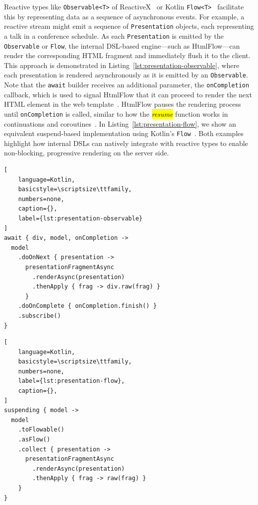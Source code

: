 \documentclass[software,article,accept,pdftex,moreauthors]{Definitions/mdpi}
\begin{document}
Reactive types like \texttt{Observable<T>} of ReactiveX~\cite{rxjava} or Kotlin \texttt{Flow<T>}~\cite{kotlinlang}
facilitate this by representing data as a sequence of asynchronous events.
For example, a reactive stream might emit a sequence of \texttt{Presentation}
objects, each representing a talk in a conference schedule.
As each \texttt{Presentation} is emitted by the \texttt{Observable}
or \texttt{Flow}, the internal DSL-based engine---such as HtmlFlow---can render the
corresponding HTML fragment and immediately flush it to the client. This
approach is demonstrated in Listing~\ref{lst:presentation-observable}, where each
presentation is rendered asynchronously as it is emitted by an
\texttt{Observable}.
Note that the \texttt{await} builder receives an additional parameter, the
\texttt{onCompletion} callback, which is used to signal HtmlFlow that it can
proceed to render the next HTML element in the web
template~\cite{carvalho2023async}.
HtmlFlow pauses the rendering process until \texttt{onCompletion} is called,
similar to how the \emph{\hl{resume}} function works in continuations and
coroutines~\cite{coroutines_continuations}.
In Listing~\ref{lst:presentation-flow}, we show an
equivalent suspend-based implementation using Kotlin's \texttt{Flow}~\cite{wise2024pssr}.
Both examples highlight how internal DSLs can natively integrate with reactive types
to enable non-blocking, progressive rendering on the server side.

\begin{listing}[H]
\caption{\textit{\hl{HtmlFlow reactive}} presentation template in Koltin with an \texttt{Observable} model.}
\begin{lstlisting}[
    language=Kotlin,
    basicstyle=\scriptsize\ttfamily,
    numbers=none,
    caption={},
    label={lst:presentation-observable}
]
await { div, model, onCompletion ->
  model
    .doOnNext { presentation ->
      presentationFragmentAsync
        .renderAsync(presentation)
        .thenApply { frag -> div.raw(frag) }
      }
    .doOnComplete { onCompletion.finish() }
    .subscribe()
}
\end{lstlisting}
\end{listing}

\vspace{-12pt}
\begin{listing}[H]
\caption{\textit{\hl{HtmlFlow suspend}} presentation template in Kotlin with a \texttt{Flow} model.}
\begin{lstlisting}[
    language=Kotlin,
    basicstyle=\scriptsize\ttfamily,
    numbers=none,
    label={lst:presentation-flow},
    caption={},
]
suspending { model ->
  model
    .toFlowable()
    .asFlow()
    .collect { presentation ->
      presentationFragmentAsync
        .renderAsync(presentation)
        .thenApply { frag -> raw(frag) }
    }
}
\end{lstlisting}
\end{listing}
\end{document}
